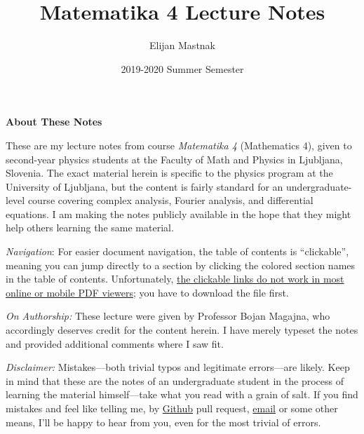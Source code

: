 \documentclass[11pt, a4paper]{article}
\begin{document}
\title{Matematika 4 Lecture Notes}
\author{Elijan Mastnak}
\date{2019-2020 Summer Semester}
\maketitle

\begin{center}
\textbf{About These Notes}
\end{center}
These are my lecture notes from course \textit{Matematika 4} (Mathematics 4), given to second-year physics students at the Faculty of Math and Physics in Ljubljana, Slovenia. The exact material herein is specific to the physics program at the University of Ljubljana, but the content is fairly standard for an undergraduate-level course covering complex analysis, Fourier analysis, and differential equations. I am making the notes publicly available in the hope that they might help others learning the same material.

\vspace{2mm}
\textit{Navigation}: For easier document navigation, the table of contents is ``clickable'', meaning you can jump directly to a section by clicking the colored section names in the table of contents. Unfortunately, \uline{the clickable links do not work in most online or mobile PDF viewers}; you have to download the file first.


\vspace{2mm}
\textit{On Authorship:} These lecture were given by Professor Bojan Magajna, who accordingly deserves credit for the content herein. I have merely typeset the notes and provided additional comments where I saw fit.


\vspace{2mm}
\textit{Disclaimer:} Mistakes---both trivial typos and legitimate errors---are likely. Keep in mind that these are the notes of an undergraduate student in the process of learning the material himself---take what you read with a grain of salt. If you find mistakes and feel like telling me, by \href{https://github.com/ejmastnak/fmf}{Github} pull request, \href{mailto:ejmastnak@gmail.com}{email} or some other means, I'll be happy to hear from you, even for the most trivial of errors.



\tableofcontents

\newpage
\end{document}
